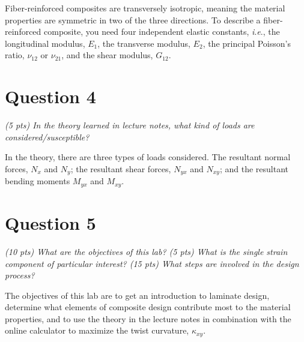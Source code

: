\documentclass[12 pt]{article}
\newcommand{\ie}{\textit{i}.\textit{e}., }
\begin{document}
Fiber-reinforced composites are transversely isotropic, meaning the material properties are symmetric in two of the three directions. To describe a fiber-reinforced composite, you need four independent elastic constants, \ie the longitudinal modulus, $E_1$, the transverse modulus, $E_2$, the principal Poisson's ratio, $\nu_{12}$ or $\nu_{21}$, and the shear modulus, $G_{12}$.

\section*{Question 4} \label{question_4}
\textit{(\num{5} pts) In the theory learned in lecture notes, what kind of loads are considered/susceptible?}

In the theory, there are three types of loads considered. The resultant normal forces, $N_x$ and $N_y$; the resultant shear forces, $N_{yx}$ and $N_{xy}$; and the resultant bending moments $M_{yx}$ and $M_{xy}$.

\section*{Question 5} \label{question_5}
\textit{(\num{10} pts) What are the objectives of this lab? (\num{5} pts) What is the single strain component of particular interest? (\num{15} pts) What steps are involved in the design process?}

The objectives of this lab are to get an introduction to laminate design, determine what elements of composite design contribute most to the material properties, and to use the theory in the lecture notes in combination with the online calculator to maximize the twist curvature, $\kappa_{xy}$.
\end{document}
